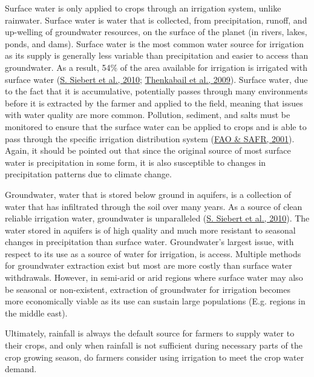 \documentclass[12pt,twoside]{reedthesis}
\begin{document}
Surface water is only applied to crops through an irrigation system, unlike rainwater. Surface water is water that is collected, from precipitation, runoff, and up-welling of groundwater resources, on the surface of the planet (in rivers, lakes, ponds, and dams). Surface water is the most common water source for irrigation as its supply is generally less variable than precipitation and easier to access than groundwater. As a result, 54\% of the area available for irrigation is irrigated with surface water (\protect\hyperlink{ref-siebertGroundwaterUseIrrigation2010}{S. Siebert et al., 2010}; \protect\hyperlink{ref-thenkabailGlobalIrrigatedArea2009}{Thenkabail et al., 2009}). Surface water, due to the fact that it is accumulative, potentially passes through many environments before it is extracted by the farmer and applied to the field, meaning that issues with water quality are more common. Pollution, sediment, and salts must be monitored to ensure that the surface water can be applied to crops and is able to pass through the specific irrigation distribution system (\protect\hyperlink{ref-faoIrrigationManualPlanning2001}{FAO \& SAFR, 2001}). Again, it should be pointed out that since the original source of most surface water is precipitation in some form, it is also susceptible to changes in precipitation patterns due to climate change.

Groundwater, water that is stored below ground in aquifers, is a collection of water that has infiltrated through the soil over many years. As a source of clean reliable irrigation water, groundwater is unparalleled (\protect\hyperlink{ref-siebertGroundwaterUseIrrigation2010}{S. Siebert et al., 2010}). The water stored in aquifers is of high quality and much more resistant to seasonal changes in precipitation than surface water. Groundwater's largest issue, with respect to its use as a source of water for irrigation, is access. Multiple methods for groundwater extraction exist but most are more costly than surface water withdrawals. However, in semi-arid or arid regions where surface water may also be seasonal or non-existent, extraction of groundwater for irrigation becomes more economically viable as its use can sustain large populations (E.g. regions in the middle east).

Ultimately, rainfall is always the default source for farmers to supply water to their crops, and only when rainfall is not sufficient during necessary parts of the crop growing season, do farmers consider using irrigation to meet the crop water demand.
\end{document}
